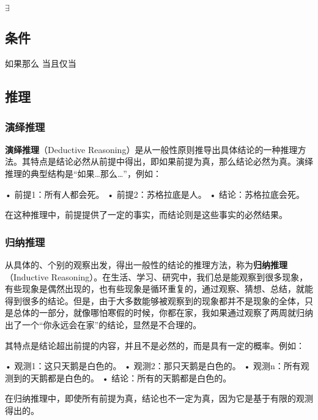 $\exists$

\subsection{条件}
如果那么 当且仅当
\subsection{推理}

\subsubsection{演绎推理}
\textbf{演绎推理}（Deductive Reasoning）是从一般性原则推导出具体结论的一种推理方法。其特点是结论必然从前提中得出，即如果前提为真，那么结论必然为真。演绎推理的典型结构是“如果…那么…”，例如：

	•	前提1：所有人都会死。
	•	前提2：苏格拉底是人。
	•	结论：苏格拉底会死。

在这种推理中，前提提供了一定的事实，而结论则是这些事实的必然结果。

\subsubsection{归纳推理}


从具体的、个别的观察出发，得出一般性的结论的推理方法，称为\textbf{归纳推理}（Inductive Reasoning）。在生活、学习、研究中，我们总是能观察到很多现象，有些现象是偶然出现的，也有些现象是循环重复的，通过观察、猜想、总结，就能得到很多的结论。但是，由于大多数能够被观察到的现象都并不是现象的全体，只是总体的一部分，就像哪怕寒假的时候，你都在家，我如果通过观察了两周就归纳出了一个“你永远会在家”的结论，显然是不合理的。


其特点是结论超出前提的内容，并且不是必然的，而是具有一定的概率。例如：

	•	观测1：这只天鹅是白色的。
	•	观测2：那只天鹅是白色的。
	•	观测n：所有观测到的天鹅都是白色的。
	•	结论：所有的天鹅都是白色的。

在归纳推理中，即使所有前提为真，结论也不一定为真，因为它是基于有限的观测得出的。